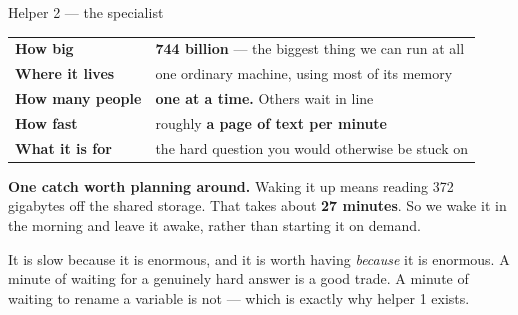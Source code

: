 \documentclass[aspectratio=169]{beamer}
\newcommand{\keybox}[1]{%
  \begin{center}
  \colorbox{black!8}{\parbox{0.92\textwidth}{\centering #1}}
  \end{center}}
\begin{document}
\begin{frame}{Helper 2 --- the specialist}

\begin{center}
\small
\begin{tabular}{@{}ll@{}}
\toprule
\textbf{How big} & \textbf{744 billion} --- the biggest thing we can run at all \\
\textbf{Where it lives} & one ordinary machine, using most of its memory \\
\textbf{How many people} & \textbf{one at a time.} Others wait in line \\
\textbf{How fast} & roughly \textbf{a page of text per minute} \\
\textbf{What it is for} & the hard question you would otherwise be stuck on \\
\bottomrule
\end{tabular}
\end{center}

\vspace{0.7em}
\keybox{\textbf{One catch worth planning around.} Waking it up means reading 372 gigabytes off the
shared storage. That takes about \textbf{27 minutes}. So we wake it in the morning and leave it
awake, rather than starting it on demand.}

\vspace{0.6em}
{\small It is slow because it is enormous, and it is worth having \emph{because} it is enormous.
A minute of waiting for a genuinely hard answer is a good trade. A minute of waiting to rename a
variable is not --- which is exactly why helper 1 exists.}

\end{frame}
\end{document}
